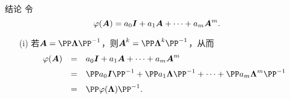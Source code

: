 \begin{frame}
  \begin{footnotesize}
    \begin{block}{结论}
      令
      $$
      \varphi(\boldsymbol{A}) = a_0 \boldsymbol{I} + a_1 \boldsymbol{A} + \cdots + a_m \boldsymbol{A}^m.
      $$
      \begin{itemize}
      \item[(i)]
        若$\A = \PP \LLambda \PP^{-1}$，则$\A^k = \PP \LLambda^k \PP^{-1}$，从而
        $$
        \begin{array}{rcl}
          \varphi(\A) &=& a_0 \II + a_1 \A + \cd + a_m \A^m \\[0.2cm]
          &=& \PP a_0 \II \PP^{-1} + \PP a_1 \LLambda\PP^{-1} + \cd + \PP a_m \LLambda^m \PP^{-1} \\[0.2cm]
          &=& \PP \varphi(\LLambda) \PP^{-1}.
        \end{array}
        $$
      \end{itemize}
    \end{block}
  \end{footnotesize}
\end{frame}


